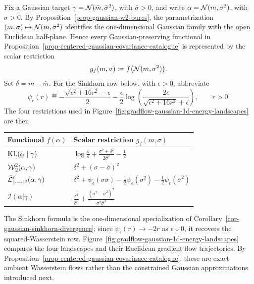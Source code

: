 Fix a Gaussian target $\gamma=\mathcal{N}(\bar m,\bar\sigma^2)$, with $\bar\sigma>0$, and write $\alpha=\mathcal{N}(m,\sigma^2)$, with $\sigma>0$. By Proposition~\ref{prop-gaussian-w2-bures}, the parametrization $(m,\sigma)\mapsto\mathcal{N}(m,\sigma^2)$ identifies the one-dimensional Gaussian family with the open Euclidean half-plane. Hence every Gaussian-preserving functional in Proposition~\ref{prop-centered-gaussian-covariance-catalogue} is represented by the scalar restriction
\[
	g_f(m,\sigma)\coloneqq f\bigl(\mathcal{N}(m,\sigma^2)\bigr).
\]
Set $\delta=m-\bar m$. For the Sinkhorn row below, with $\epsilon>0$, abbreviate
\[
	\psi_\epsilon(r)
	\eqdef
	-\frac{\sqrt{\epsilon^2+16r^2}-\epsilon}{2}
	-\frac{\epsilon}{2}
	\log\!\left(
		\frac{2\epsilon}{\sqrt{\epsilon^2+16r^2}+\epsilon}
	\right),
	\qquad r>0.
\]
The four restrictions used in Figure~\ref{fig:gradflow-gaussian-1d-energy-landscapes} are then
\begin{center}
\begingroup
\small
\renewcommand{\arraystretch}{1.55}
\begin{tabularx}{\linewidth}{>{\raggedright\arraybackslash}p{.34\linewidth}>{\raggedright\arraybackslash}X}
	\hline
	Functional $f(\alpha)$ & Scalar restriction $g_f(m,\sigma)$ \\
	\hline
	$\operatorname{KL}(\alpha\mid\gamma)$
	& $\displaystyle
	\log\frac{\bar\sigma}{\sigma}
	+\frac{\sigma^2+\delta^2}{2\bar\sigma^2}-\frac12$
	\\
	$\operatorname{\mathcal{W}}_2^2(\alpha,\gamma)$
	& $\displaystyle \delta^2+(\sigma-\bar\sigma)^2$
	\\
	$\displaystyle \bar{\mathcal{L}}_{|\!| \cdot-\cdot |\!|^2}^{\varepsilon}(\alpha,\gamma)$
	& $\displaystyle
	\delta^2+\psi_\epsilon(\sigma\bar\sigma)
	-\frac12\psi_\epsilon(\sigma^2)
	-\frac12\psi_\epsilon(\bar\sigma^2)$
	\\
	$\mathcal I(\alpha|\gamma)$
	& $\displaystyle
	\frac{\delta^2}{\bar\sigma^4}
	+\frac{(\sigma^2-\bar\sigma^2)^2}{\sigma^2\bar\sigma^4}$
	\\
	\hline
\end{tabularx}
\endgroup
\end{center}
The Sinkhorn formula is the one-dimensional specialization of Corollary~\ref{cor-gaussian-sinkhorn-divergence}; since $\psi_\epsilon(r)\to-2r$ as $\epsilon\downarrow0$, it recovers the squared-Wasserstein row. Figure~\ref{fig:gradflow-gaussian-1d-energy-landscapes} compares the four landscapes and their Euclidean gradient-flow trajectories. By Proposition~\ref{prop-centered-gaussian-covariance-catalogue}, these are exact ambient Wasserstein flows rather than the constrained Gaussian approximations introduced next.

